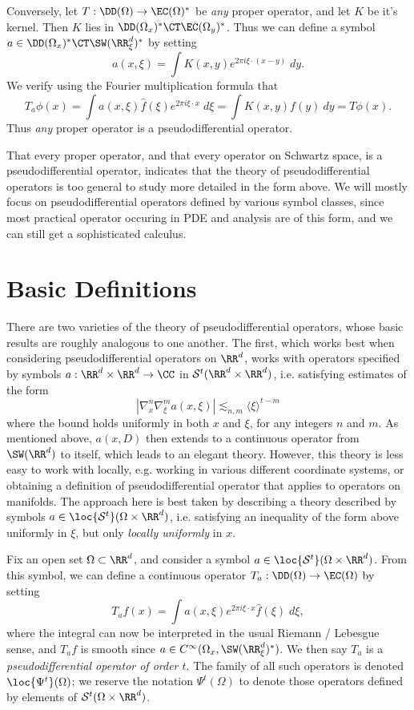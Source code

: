 \begin{itemize}
    Conversely, let $T: \DD(\Omega) \to \EC(\Omega)^*$ be \emph{any} proper operator, and let $K$ be it's kernel. Then $K$ lies in $\DD(\Omega_x)^* \CT \EC(\Omega_y)^*$. Thus we can define a symbol $a \in \DD(\Omega_x)^* \CT \SW(\RR^d_\xi)^*$ by setting
    \[ a(x,\xi) = \int K(x,y) e^{2 \pi i \xi \cdot (x - y)}\; dy. \]
    We verify using the Fourier multiplication formula that
    \[ T_a \phi(x) = \int a(x,\xi) \widehat{f}(\xi) e^{2 \pi i \xi \cdot x}\; d\xi = \int K(x,y) f(y)\ dy = T\phi(x). \]
    Thus \emph{any} proper operator is a pseudodifferential operator.
\end{itemize}
%
That every proper operator, and that every operator on Schwartz space, is a pseudodifferential operator, indicates that the theory of pseudodifferential operators is too general to study more detailed in the form above. We will mostly focus on pseudodifferential operators defined by various symbol classes, since most practical operator occuring in PDE and analysis are of this form, and we can still get a sophisticated calculus.

\section{Basic Definitions}

There are two varieties of the theory of pseudodifferential operators, whose basic results are roughly analogous to one another. The first, which works best when considering pseudodifferential operators on $\RR^d$, works with operators specified by symbols $a: \RR^d \times \RR^d \to \CC$ in $\mathcal{S}^t(\RR^d \times \RR^d)$, i.e. satisfying estimates of the form
%
\[ |\nabla^n_x \nabla^m_\xi a(x,\xi)| \lesssim_{n,m} \langle \xi \rangle^{t-m} \]
%
where the bound holds uniformly in both $x$ and $\xi$, for any integers $n$ and $m$. As mentioned above, $a(x,D)$ then extends to a continuous operator from $\SW(\RR^d)$ to itself, which leads to an elegant theory. However, this theory is less easy to work with locally, e.g. working in various different coordinate systems, or obtaining a definition of pseudodifferential operator that applies to operators on manifolds. The approach here is best taken by describing a theory described by symbols $a \in \loc{\mathcal{S}^t}(\Omega \times \RR^d)$, i.e. satisfying an inequality of the form above uniformly in $\xi$, but only \emph{locally uniformly} in $x$.

Fix an open set $\Omega \subset \RR^d$, and consider a symbol $a \in \loc{\mathcal{S}^t}(\Omega \times \RR^d)$. From this symbol, we can define a continuous operator $T_a: \DD(\Omega) \to \EC(\Omega)$ by setting
%
\[ T_a f(x) = \int a(x,\xi) e^{2 \pi i \xi \cdot x} \widehat{f}(\xi)\; d\xi, \]
%
where the integral can now be interpreted in the usual Riemann / Lebesgue sense, and $T_a f$ is smooth since $a \in C^\infty(\Omega_x, \SW(\RR^d_\xi)^*)$. We then say $T_a$ is a \emph{pseudodifferential operator of order $t$}. The family of all such operators is denoted $\loc{\Psi^t}(\Omega)$; we reserve the notation $\Psi^t(\Omega)$ to denote those operators defined by elements of $\mathcal{S}^t(\Omega \times \RR^d)$.


